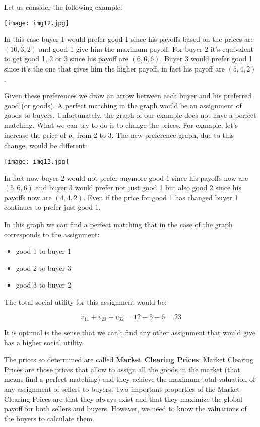 Let us consider the following example:

\centerline{
\texttt{[image: img12.jpg]}}

In this case buyer 1 would prefer good 1 since his payoffs based on the prices are $(10,3,2)$ and good 1 give him the maximum payoff. For buyer 2 it's equivalent to get good 1, 2 or 3 since his payoff are $(6,6,6)$. Buyer 3 would prefer good 1 since it's the one that gives him the higher payoff, in fact his payoff are $(5,4,2)$.

Given these preferences we draw an arrow between each buyer and his preferred good (or goods). A perfect matching in the graph would be an assignment of goods to buyers. Unfortunately, the graph of our example does not have a perfect matching. What we can try to do is to change the prices. For example, let's increase the price of $p_1$ from 2 to 3. The new preference graph, due to this change, would be different:

\centerline{
\texttt{[image: img13.jpg]}}

In fact now buyer 2 would not prefer anymore good 1 since his payoffs now are $(5,6,6)$ and buyer 3 would prefer not just good 1 but also good 2 since his payoffs now are $(4,4,2)$. Even if the price for good 1 has changed buyer 1 continues to prefer just good 1.

In this graph we can find a perfect matching that in the case of the graph corresponds to the assignment: 

\begin{itemize}
	\item good 1 to buyer 1 
	\item good 2 to buyer 3 
	\item good 3 to buyer 2 
\end{itemize}

The total social utility for this assignment would be:

\begin{equation}
v_{11}+v_{23} +v_{32}=12+5+6=23
\end{equation}

It is optimal is the sense that we can't find any other assignment that would give has a higher social utility.

The prices so determined are called \textbf{Market Clearing Prices}. Market Clearing Prices are those prices that allow to assign all the goods in the market (that means find a perfect matching) and they achieve the maximum total valuation of any assignment of sellers to buyers. Two important properties of the Market Clearing Prices are that they always exist and that they maximize the global payoff for both sellers and buyers. However, we need to know the valuations of the buyers to calculate them.


